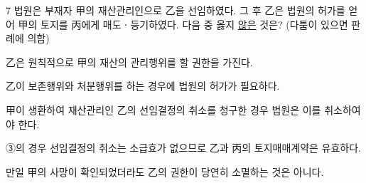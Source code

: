 \begin{question}{7}
법원은 부재자 甲의 재산관리인으로 乙을 선임하였다. 그 후 乙은 법원의 허가를 얻어 甲의 토지를 丙에게 매도ㆍ등기하였다. 다음 중 옳지 \uline{않은} 것은? (다툼이 있으면 판례에 의함)
\begin{choices}
  \item 乙은 원칙적으로 甲의 재산의 관리행위를 할 권한을 가진다.
  \item 乙이 보존행위와 처분행위를 하는 경우에 법원의 허가가 필요하다.
  \item 甲이 생환하여 재산관리인 乙의 선임결정의 취소를 청구한 경우 법원은 이를 취소하여야 한다.
  \item ③의 경우 선임결정의 취소는 소급효가 없으므로 乙과 丙의 토지매매계약은 유효하다.
  \item 만일 甲의 사망이 확인되었더라도 乙의 권한이 당연히 소멸하는 것은 아니다.
\end{choices}
\end{question}
